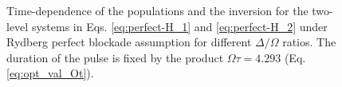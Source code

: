 \documentclass[rmp,10pt,onecolumn,fleqn,notitlepage]{revtex4-1}
\begin{document}
\begin{figure}[h!]
\begin{minipage}[c]{0.49\linewidth}
\end{minipage}
\begin{minipage}[]{0.49\linewidth}
\centering
{}
\end{minipage}
\caption{Time-dependence of the populations and the inversion for the two-level systems in Eqs. \eqref{eq:perfect-H_1} and \eqref{eq:perfect-H_2} under Rydberg perfect blockade assumption for different $\Delta/\Omega$ ratios. The duration of the pulse is fixed by the product $\Omega \tau = 4.293$ (Eq. \eqref{eq:opt_val_Ot}). }
\label{fig:population_perfect-blockade}
\end{figure}
\end{document}
